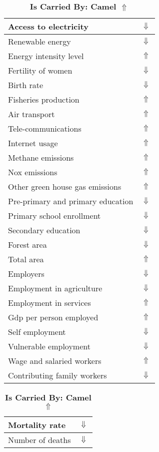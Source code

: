 \documentclass[12pt,notitlepage,oneside]{report}
\begin{document}
\begin{table}[!htb]
\caption{\textbf{Is Carried By: Camel $\Uparrow$}}
\centering
\label{Correlated Socio-economic Factors0}
\begin{tabular}{|l|l|}
\hline
Access to electricity & $\Downarrow$\\ \hline
Renewable energy & $\Downarrow$\\ \hline
Energy intensity level & $\Uparrow$\\ \hline
Fertility of women & $\Downarrow$\\ \hline
Birth rate & $\Downarrow$\\ \hline
Fisheries production & $\Uparrow$\\ \hline
Air transport  & $\Uparrow$\\ \hline
Tele-communications & $\Uparrow$\\ \hline
Internet usage & $\Uparrow$\\ \hline
Methane emissions & $\Uparrow$\\ \hline
Nox emissions & $\Uparrow$\\ \hline
Other green house gas emissions & $\Uparrow$\\ \hline
Pre-primary and primary education & $\Downarrow$\\ \hline
Primary school enrollment & $\Downarrow$\\ \hline
Secondary education & $\Downarrow$\\ \hline
Forest area & $\Downarrow$\\ \hline
Total area & $\Uparrow$\\ \hline
Employers & $\Downarrow$\\ \hline
Employment in agriculture & $\Downarrow$\\ \hline
Employment in services & $\Uparrow$\\ \hline
Gdp per person employed & $\Uparrow$\\ \hline
Self employment & $\Downarrow$\\ \hline
Vulnerable employment & $\Downarrow$\\ \hline
Wage and salaried workers & $\Uparrow$\\ \hline
Contributing family workers & $\Downarrow$\\ \hline
\end{tabular}
\begin{tabular}{|l|l|}
\hline
Mortality rate & $\Downarrow$\\ \hline
Number of deaths & $\Downarrow$\\ \hline

\end{tabular}
\end{table}
\end{document}

